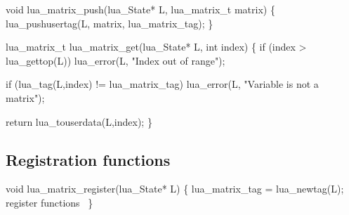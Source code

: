 \nwenddocs{}\plusendmoddef
void lua_matrix_push(lua_State* L, lua_matrix_t matrix)
\{
    lua_pushusertag(L, matrix, lua_matrix_tag);
\}

lua_matrix_t lua_matrix_get(lua_State* L, int index)
\{
    if (index > lua_gettop(L))
        lua_error(L, "Index out of range");

    if (lua_tag(L,index) != lua_matrix_tag)
        lua_error(L, "Variable is not a matrix");

    return lua_touserdata(L,index);
\}

\nwendcode{}\nwdocspar


\subsection{Registration functions}

\nwenddocs{}\plusendmoddef
void lua_matrix_register(lua_State* L)
\{
    lua_matrix_tag = lua_newtag(L);
    \LA{}register functions~{\nwtagstyle{}}\RA{}
\}

\nwendcode{}


